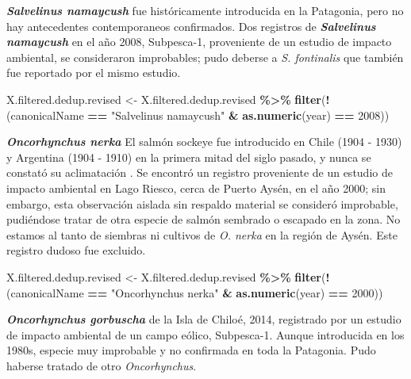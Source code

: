 \documentclass[sn-apa,pdflatex]{sn-jnl}
\newenvironment{Shaded}{\begin{snugshade}}{\end{snugshade}}
\newcommand{\DecValTok}[1]{\textcolor[rgb]{0.00,0.00,0.81}{#1}}
\newcommand{\FunctionTok}[1]{\textcolor[rgb]{0.13,0.29,0.53}{\textbf{#1}}}
\newcommand{\NormalTok}[1]{#1}
\newcommand{\OtherTok}[1]{\textcolor[rgb]{0.56,0.35,0.01}{#1}}
\newcommand{\SpecialCharTok}[1]{\textcolor[rgb]{0.81,0.36,0.00}{\textbf{#1}}}
\newcommand{\StringTok}[1]{\textcolor[rgb]{0.31,0.60,0.02}{#1}}
\begin{document}
\textbf{\emph{Salvelinus namaycush}} fue históricamente introducida en
la Patagonia, pero no hay antecedentes contemporaneos confirmados. Dos
registros de \textbf{\emph{Salvelinus namaycush}} en el año 2008,
Subpesca-1, proveniente de un estudio de impacto ambiental, se
consideraron improbables; pudo deberse a \emph{S. fontinalis} que
también fue reportado por el mismo estudio.

\begin{Shaded}
\begin{Highlighting}[]
\NormalTok{X.filtered.dedup.revised }\OtherTok{\textless{}{-}}\NormalTok{ X.filtered.dedup.revised }\SpecialCharTok{\%\textgreater{}\%}
    \FunctionTok{filter}\NormalTok{(}\SpecialCharTok{!}\NormalTok{(canonicalName }\SpecialCharTok{==} \StringTok{"Salvelinus namaycush"} \SpecialCharTok{\&} \FunctionTok{as.numeric}\NormalTok{(year) }\SpecialCharTok{==}
        \DecValTok{2008}\NormalTok{))}
\end{Highlighting}
\end{Shaded}

\textbf{\emph{Oncorhynchus nerka}} El salmón sockeye fue introducido en
Chile (1904 - 1930) y Argentina (1904 - 1910) en la primera mitad del
siglo pasado, y nunca se constató su aclimatación
\citep{basultoLargoViajeSalmones2003}. Se encontró un registro
proveniente de un estudio de impacto ambiental en Lago Riesco, cerca de
Puerto Aysén, en el año 2000; sin embargo, esta observación aislada sin
respaldo material se consideró improbable, pudiéndose tratar de otra
especie de salmón sembrado o escapado en la zona. No estamos al tanto de
siembras ni cultivos de \emph{O. nerka} en la región de Aysén. Este
registro dudoso fue excluido.

\begin{Shaded}
\begin{Highlighting}[]
\NormalTok{X.filtered.dedup.revised }\OtherTok{\textless{}{-}}\NormalTok{ X.filtered.dedup.revised }\SpecialCharTok{\%\textgreater{}\%}
    \FunctionTok{filter}\NormalTok{(}\SpecialCharTok{!}\NormalTok{(canonicalName }\SpecialCharTok{==} \StringTok{"Oncorhynchus nerka"} \SpecialCharTok{\&} \FunctionTok{as.numeric}\NormalTok{(year) }\SpecialCharTok{==}
        \DecValTok{2000}\NormalTok{))}
\end{Highlighting}
\end{Shaded}

\textbf{\emph{Oncorhynchus gorbuscha}} de la Isla de Chiloé, 2014,
registrado por un estudio de impacto ambiental de un campo eólico,
Subpesca-1. Aunque introducida en los 1980s, especie muy improbable y no
confirmada en toda la Patagonia. Pudo haberse tratado de otro
\emph{Oncorhynchus}.
\end{document}

